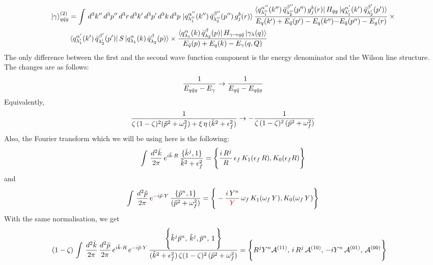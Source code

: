 \documentclass[9pt]{article}
\newcommand{\chg}[1]{{\color{red}#1}}
\numberwithin{equation}{section}
\begin{document}
\begin{enumerate}
\begin{align}
\end{align}
\begin{align}
    \ket{\gamma}^{(2)}_{q\Bar{q}g} & =  \int\, d^{3}k''\, d^{3}p''\, d^{3}r\, d^{3}k'\, d^{3}p'\, d^{3}k\, d^{3}p\,\ket{q^{\alpha''}_{\lambda''_{1}}(k'')\,\Bar{q}^{\beta''}_{\lambda''_{2}}(p'')\,g^{b}_{j}(r)}\frac{\bra{q^{\alpha''}_{\lambda''_{1}}(k'')\,\Bar{q}^{\beta''}_{\lambda''_{2}}(p'')\,g^{b}_{j}(r)}H_{\Bar{q}g}\ket{q^{\alpha'}_{\lambda'_{1}}(k')\,\Bar{q}^{\beta'}_{\lambda'_{2}}(p')}}{E_{q}(k')+E_{\Bar{q}}(p')-E_{q}(k'')\chg{-}E_{\Bar{q}}(p'')-E_{g}(r)}\,\times \notag \\ & \bra{q^{\alpha'}_{\lambda'_{1}}(k')\,\Bar{q}^{\beta'}_{\lambda'_{2}}(p')}S\ket{q^{\alpha}_{\lambda_{1}}(k)\,\Bar{q}^{\beta}_{\lambda_{2}}(p)}\times  \frac{\bra{q^{\alpha}_{\lambda_{1}}(k)\,\Bar{q}^{\beta}_{\lambda_{2}}(p)}H_{\gamma\rightarrow q\Bar{q}}\ket{\gamma_{\lambda}(q)}}{E_{\Bar{q}}(p)+E_{q}(k)-E_{\gamma}(q,Q)}
\label{chg:dena}\end{align}
The only difference between the first and the second wave function component is the energy denominator and the Wilson line structure. The changes are as follows:
$$\frac{1}{E_{q\Bar{q}g}-E_{\gamma}}\rightarrow \frac{1}{E_{q\Bar{q}}-E_{q\Bar{q}g}}$$ 
Equivalently,
$$\frac{1}{\zeta\,(1-\zeta)^{2}(\Tilde{p}^{2}+\omega^{2}_{f})+\xi\,\eta\, (\Tilde{k}^{2}+\epsilon_{f}^{2})}\rightarrow -\frac{1}{\zeta\,(1-\zeta)^{2}\,(\Tilde{p}^{2}+\omega^{2}_{f})}$$
Also, the Fourier transform which we will be using here is the following:
$$\int\, \frac{d^{2}\Tilde{k}}{2\pi}\, e^{i\Tilde{k}\cdot R}\, \frac{\{\Tilde{k}^{j},1\}}{\Tilde{k}^{2}+\epsilon^{2}_{f}} = \Bigg\{\frac{i\,R^{j}}{R}\,\epsilon_{f}\,K_{1}(\epsilon_{f}\,R),K_{0}(\epsilon_{f} R)\Bigg\}$$
and \label{chg:pFT}$$\int\, \frac{d^{2}\Tilde{p}}{2\pi}\, e^{\chg{-}i\Tilde{p}\cdot Y}\,\frac{\{\Tilde{p}^{n},1\}}{(\Tilde{p}^{2}+\omega^{2}_{f})} = \Bigg\{-\frac{i\,Y^{n}}{\chg{Y}}\,\omega_{f}\,K_{1}(\omega_{f}\,Y),K_{0}(\omega_{f}\,Y)\Bigg\} $$
\label{chg:ty4}With the \chg{same} normalisation, we get
\begin{align}
    (1-\zeta)\, \int\, \frac{d^{2}\Tilde{k}}{2\pi}\, \frac{d^{2}\Tilde{p}}{2\pi}\, e^{i\Tilde{k}\cdot R}\,e^{\chg{-}i\Tilde{p}\cdot Y}\, \frac{\Bigg\{\Tilde{k}^{j}\Tilde{p}^{n},\,\Tilde{k}^{j},\Tilde{p}^{n},\,1\,\Bigg\}}{(\Tilde{k}^{2}+\epsilon^{2}_{f})\,\zeta(1-\zeta)^{2}\,(\Tilde{p}^{2} +\omega^{2}_{f})} & = \Bigg\{R^{j}Y^{n}\mathcal{A}^{(11)},\, i\,R^{j}\,\mathcal{A}^{(10)},\, -iY^{n}\,\mathcal{A}^{(01)},\, \mathcal{A}^{(00)}\Bigg\}
\label{chg:pFT2}\end{align}

\end{enumerate}
\end{document}
